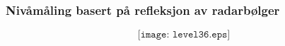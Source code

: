 \documentclass[aspectratio=169,xcolor=dvipsnames]{beamer}
\begin{document}
%
%
%
%
%
\begin{frame}
	\frametitle{Nivåmåling basert på refleksjon av radarbølger}

$$\texttt{[image: level36.eps]}$$
\end{frame}
%
\end{document}
